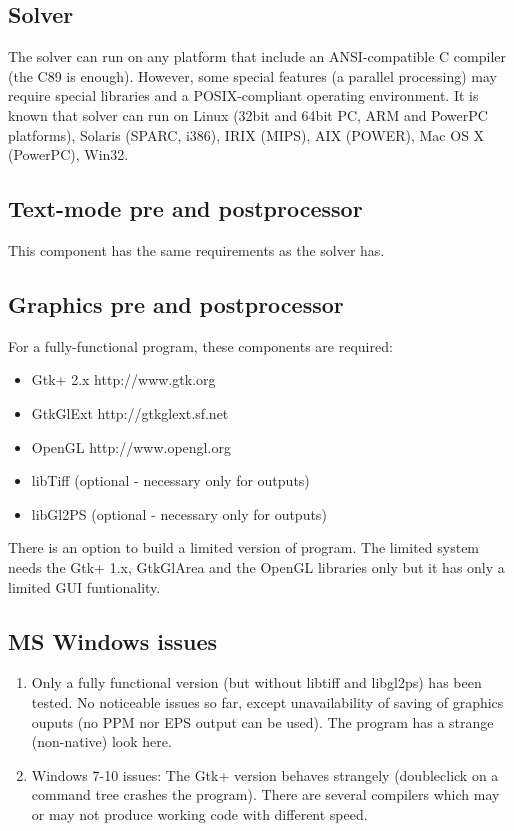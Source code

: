 \documentclass{article}
\begin{document}
\subsection{Solver}

 The solver can run on any platform that include an ANSI-compatible
 C compiler (the C89 is enough). However, some special features
 (a parallel processing) may require special libraries and 
 a POSIX-compliant operating environment. It is known that
 solver can run on Linux (32bit and 64bit PC, ARM and PowerPC
 platforms), Solaris (SPARC, i386), IRIX (MIPS), AIX (POWER),
 Mac OS X (PowerPC), Win32.



\subsection{Text-mode pre and postprocessor}

 This component has the same requirements as the solver has.



\subsection{Graphics pre and postprocessor}

 For a fully-functional program, these components are required:


\begin{itemize}
\item  Gtk+ 2.x  http://www.gtk.org
\item  GtkGlExt http://gtkglext.sf.net
\item  OpenGL http://www.opengl.org
\item  libTiff (optional - necessary only for outputs)
\item  libGl2PS (optional - necessary only for outputs)
\end{itemize}

 There is an option to build a limited version of program.
 The limited system needs the Gtk+ 1.x, GtkGlArea and the OpenGL
 libraries only but it has only a limited GUI funtionality. 	



\subsection{MS Windows issues}

\begin{enumerate}
 \item
 Only a fully functional version (but without libtiff and
 libgl2ps) has been tested. No noticeable issues so far, except
 unavailability of saving of graphics ouputs (no PPM nor EPS
 output can be used).
 The program has a strange (non-native) look here.
 \item Windows 7-10 issues: The Gtk+ version behaves strangely
 (doubleclick on a command tree crashes the program). There are
 several compilers which may or may not produce working code with
 different speed.
\end{enumerate}
\end{document}
